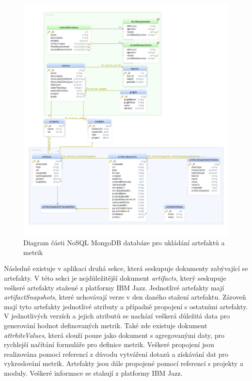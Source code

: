 \documentclass[czech,master,public,dept460,male,cpdeclaration,oneside]{diploma}
\begin{document}
\begin{figure}[!ht]
    \centering
    \includegraphics[width=1\textwidth]{Diplomka/Figures/db_diagram.png}
    \caption{Diagram části NoSQL MongoDB databáze pro ukládání artefaktů a metrik}
    \label{fig:mongo_diagram}
\end{figure}
Následně existuje v aplikaci druhá sekce, která seskupuje dokumenty zabývající se artefakty. V této sekci je nejdůležitější dokument \textit{artifacts}, který seskupuje veškeré artefakty stažené z platformy IBM Jazz. Jednotlivé artefakty mají \textit{artifactSnapshots}, které uchovávají verze v den daného stažení artefaktu. Zároveň mají tyto artefakty jednotlivé atributy a případně propojení s ostatními artefakty. V jednotlivých verzích a jejich atributů se nachází veškerá důležitá data pro generování hodnot definovaných metrik. Také zde existuje dokument \textit{attrbiteValues}, která slouží pouze jako dokument s agregovanými daty, pro rychlejší načítání formuláře pro definice metrik. Veškeré propojení jsou realizována pomocí referencí z důvodu vytváření dotazů a získávání dat pro vykreslování metrik. Artefakty jsou dále propojené pomocí referencí s projekty a moduly. Veškeré informace se stahují z platformy IBM Jazz.
\end{document}
